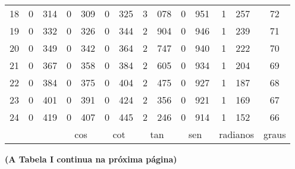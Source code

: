 \begin{tabular}{c|r@{,}l|r@{,}l r@{,}l r@{,}l r@{,}l|r@{,}l|c}
  18 & 0&314 & 0&309 & 0&325 & 3&078 & 0&951 & 1&257 & 72 \\
  19 & 0&332 & 0&326 & 0&344 & 2&904 & 0&946 & 1&239 & 71 \\
  20 & 0&349 & 0&342 & 0&364 & 2&747 & 0&940 & 1&222 & 70 \\
  21 & 0&367 & 0&358 & 0&384 & 2&605 & 0&934 & 1&204 & 69 \\
  22 & 0&384 & 0&375 & 0&404 & 2&475 & 0&927 & 1&187 & 68 \\
  23 & 0&401 & 0&391 & 0&424 & 2&356 & 0&921 & 1&169 & 67 \\
  24 & 0&419 & 0&407 & 0&445 & 2&246 & 0&914 & 1&152 & 66 \\
  \hline
    & \multicolumn{2}{c|}{ } & \multicolumn{2}{c}{cos} & \multicolumn{2}{c}{cot} & \multicolumn{2}{c}{tan} & \multicolumn{2}{c|}{sen} & \multicolumn{2}{c|}{radianos} & graus \\
  \hline
\end{tabular}

\vspace{1ex}

\hfill \textbf{(A Tabela I continua na próxima página)}


